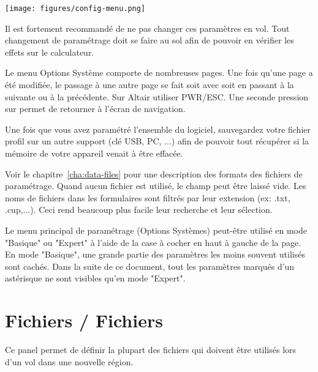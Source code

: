 \begin{center}
\texttt{[image: figures/config-menu.png]}
\end{center}

Il est fortement recommandé de ne pas changer ces paramètres en vol. \warning Tout changement de paramétrage doit se faire au sol afin de pouvoir en vérifier les effets sur le calculateur. 

Le menu Options Système comporte de nombreuses pages. Une fois qu'une page a été modifiée, le passage à une autre page se fait soit avec   soit en passant à la suivante ou à la précédente. Sur Altair utiliser PWR/ESC. Une seconde pression sur  permet de retourner à l'écran de navigation.

\tip Une fois que vous avez paramétré l'ensemble du logiciel, sauvegardez votre fichier profil sur un autre support (clé USB, PC, ...) afin de pouvoir tout récupérer si la mémoire de votre appareil venait à être effacée.

Voir le chapitre~\ref{cha:data-files} pour une description des formats des fichiers de paramétrage. Quand aucun fichier est utilisé, le champ peut être laissé vide. Les noms de fichiers dans les formulaires sont filtrés par leur extension (ex: .txt, .cup,...). Ceci rend beaucoup plus facile leur recherche et leur sélection.

Le menu principal de paramétrage (Options Systèmes) peut-être utilisé en mode "Basique" ou "Expert" à l'aide de la case à cocher en haut à gauche de la page.  En mode "Basique", une grande partie des paramètres les moins souvent utilisés sont cachés. Dans la suite de ce document, tout les paramètres marqués d'un astérisque ne sont visibles qu'en mode "Expert".


\section{Fichiers / Fichiers}
Ce panel permet de définir la plupart des fichiers qui doivent être utilisés lors d'un vol dans une nouvelle région.

